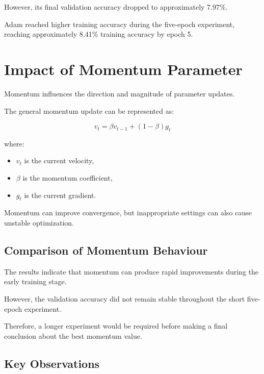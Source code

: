 \documentclass[12pt,a4paper]{report}
\begin{document}
However, its final validation accuracy dropped to approximately
7.97\%.

Adam reached higher training accuracy during the five-epoch
experiment, reaching approximately 8.41\% training accuracy by
epoch 5.

\section{Impact of Momentum Parameter}

Momentum influences the direction and magnitude of parameter
updates.

The general momentum update can be represented as:

\[
v_t=\beta v_{t-1}+(1-\beta)g_t
\]

where:

\begin{itemize}
    \item $v_t$ is the current velocity,
    \item $\beta$ is the momentum coefficient,
    \item $g_t$ is the current gradient.
\end{itemize}

Momentum can improve convergence, but inappropriate settings can
also cause unstable optimization.

\subsection{Comparison of Momentum Behaviour}

The results indicate that momentum can produce rapid improvements
during the early training stage.

However, the validation accuracy did not remain stable throughout
the short five-epoch experiment.

Therefore, a longer experiment would be required before making a
final conclusion about the best momentum value.

\subsection{Key Observations}
\end{document}
